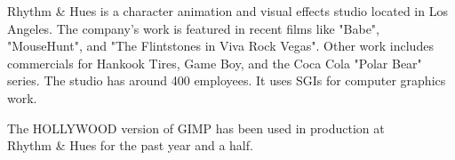 Rhythm \& Hues is a character animation and visual effects studio located in
Los Angeles. The company's work is featured in recent films  like "Babe",
"MouseHunt", and "The Flintstones in Viva Rock Vegas". Other work includes
commercials for Hankook Tires, Game Boy, and the Coca Cola "Polar Bear" series.
The studio has around 400 employees. It uses SGIs for computer graphics work. 

The HOLLYWOOD version of GIMP  has been used in production at \\Rhythm \& Hues for the past year and a half.
